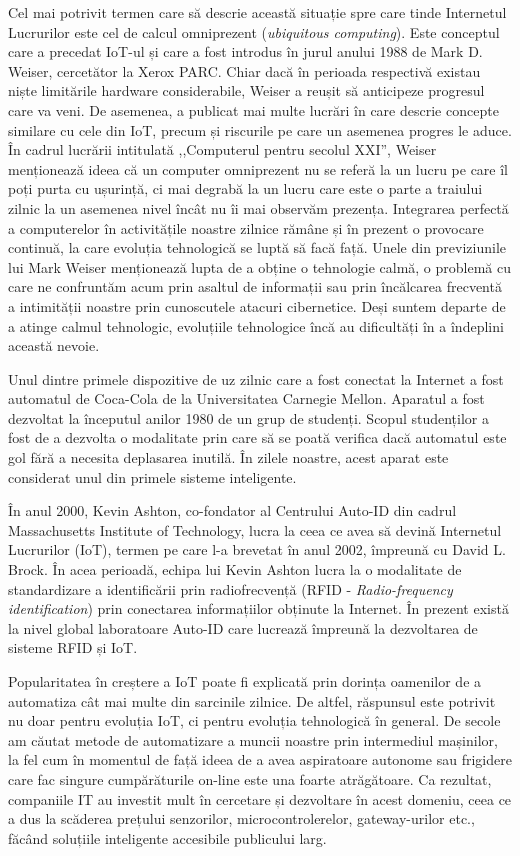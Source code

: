 Cel mai potrivit termen care să descrie această situație spre care tinde
Internetul Lucrurilor este cel de calcul omniprezent (\textit{ubiquitous computing}).
Este conceptul care a precedat IoT-ul și care a fost introdus în jurul anului
1988 de Mark D. Weiser, cercetător la Xerox PARC. Chiar dacă în perioada
respectivă existau niște limitările hardware considerabile, Weiser a reușit să
anticipeze progresul care va veni. De asemenea, a publicat mai multe lucrări
în care descrie concepte similare cu cele din IoT, precum și riscurile pe
care un asemenea progres le aduce. În cadrul lucrării intitulată ,,Computerul
pentru secolul XXI'', Weiser menționează ideea că un computer omniprezent nu se
referă la un lucru pe care îl poți purta cu ușurință, ci mai degrabă la un lucru
care este o parte a traiului zilnic la un asemenea nivel încât nu îi mai
observăm prezența. Integrarea perfectă a computerelor în activitățile noastre
zilnice rămâne și în prezent o provocare continuă, la care evoluția tehnologică
se luptă să facă față. Unele din previziunile lui Mark Weiser menționează lupta
de a obține o tehnologie calmă, o problemă cu care ne confruntăm acum prin
asaltul de informații sau prin încălcarea frecventă a intimității noastre prin
cunoscutele atacuri cibernetice. Deși suntem departe de a atinge calmul
tehnologic, evoluțiile tehnologice încă au dificultăți în a îndeplini această nevoie.

Unul dintre primele dispozitive de uz zilnic care a fost conectat la Internet a
fost automatul de Coca-Cola de la Universitatea Carnegie Mellon. Aparatul a fost
dezvoltat la începutul anilor 1980 de un grup de studenți. Scopul studenților a
fost de a dezvolta o modalitate prin care să se poată verifica dacă automatul
este gol fără a necesita deplasarea inutilă. În zilele noastre, acest aparat
este considerat unul din primele sisteme inteligente.

În anul 2000, Kevin Ashton, co-fondator al Centrului Auto-ID din cadrul
Massachusetts Institute of Technology, lucra la ceea ce avea să devină Internetul
Lucrurilor (IoT), termen pe care l-a brevetat în anul 2002, împreună cu David L.
Brock. În acea perioadă, echipa lui Kevin Ashton lucra la o modalitate de
standardizare a identificării prin radiofrecvență (RFID - \textit{Radio-frequency identification}) prin conectarea
informațiilor obținute la Internet. În prezent există la nivel global
laboratoare Auto-ID care lucrează împreună la dezvoltarea de sisteme RFID și
IoT.

Popularitatea în creștere a IoT poate fi explicată prin dorința oamenilor de a automatiza cât
mai multe din sarcinile zilnice. De altfel, răspunsul este potrivit nu doar
pentru evoluția IoT, ci pentru evoluția tehnologică în general. De secole am
căutat metode de automatizare a muncii noastre prin intermediul mașinilor, la
fel cum în momentul de față ideea de a avea aspiratoare autonome sau frigidere
care fac singure cumpărăturile on-line este una foarte atrăgătoare. Ca rezultat,
companiile IT au investit mult în cercetare și dezvoltare în acest domeniu, ceea
ce a dus la scăderea prețului senzorilor, microcontrolerelor, gateway-urilor
etc., făcând soluțiile inteligente accesibile publicului larg.

